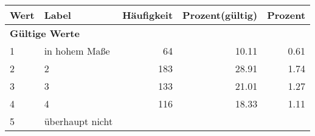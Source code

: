      \begin{longtable}{lXrrr}
     \toprule
     \textbf{Wert} & \textbf{Label} & \textbf{Häufigkeit} & \textbf{Prozent(gültig)} & \textbf{Prozent} \\
     \endhead
     \midrule
     \multicolumn{5}{l}{\textbf{Gültige Werte}}\\

     1 &
     \multicolumn{1}{X}{ in hohem Maße   } &


       \num{64} &
       \num[round-mode=places,round-precision=2]{10.11} &
         \num[round-mode=places,round-precision=2]{0.61} \\

     2 &
     \multicolumn{1}{X}{ 2   } &


       \num{183} &
       \num[round-mode=places,round-precision=2]{28.91} &
         \num[round-mode=places,round-precision=2]{1.74} \\

     3 &
     \multicolumn{1}{X}{ 3   } &


       \num{133} &
       \num[round-mode=places,round-precision=2]{21.01} &
         \num[round-mode=places,round-precision=2]{1.27} \\

     4 &
     \multicolumn{1}{X}{ 4   } &


       \num{116} &
       \num[round-mode=places,round-precision=2]{18.33} &
         \num[round-mode=places,round-precision=2]{1.11} \\

     5 &
     \multicolumn{1}{X}{ überhaupt nicht   } &



\end{longtable}
